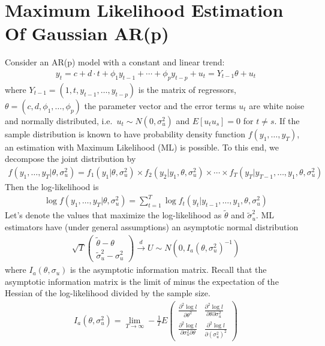 \section[Maximum Likelihood Estimation Of Gaussian AR(p)]{Maximum Likelihood Estimation Of Gaussian AR(p)\label{ex:MaximumLikelihoodEstimationGaussianARp}}
Consider an AR(p) model with a constant and linear trend:
\begin{align*}
y_t = c + d\cdot t + \phi_1 y_{t-1} + \cdots + \phi_p y_{t-p} +u_{t}=Y_{t-1}\theta + u_t
\end{align*}
  where \(Y_{t-1}=(1,t, y_{t-1},\ldots,y_{t-p})\) is the matrix of regressors,
  \(\theta = (c,d,\phi_1,\ldots,\phi_p)\) the parameter vector
  and the error terms \(u_t\) are white noise and normally distributed,
  i.e.\ \( u_t\sim N(0,\sigma_u^2) \) and \(E[u_t u_s]=0\) for \(t\neq s\).
If the sample distribution is known to have probability density function \(f(y_1,\ldots,y_T)\),
  an estimation with Maximum Likelihood (ML) is possible.
To this end, we decompose the joint distribution by
\begin{align*}
f(y_1,\ldots,y_T|\theta,\sigma_u^2)= f_1(y_1|\theta,\sigma_u^2) \times f_2(y_2|y_1,\theta,\sigma_u^2)\times \cdots \times f_T(y_T|y_{T-1},\ldots,y_1,\theta,\sigma_u^2)
\end{align*}
Then the log-likelihood is
\begin{align*}
\log f(y_1,\ldots,y_T|\theta,\sigma_u^2)=\sum_{t=1}^T \log f_t(y_t|y_{t-1},\ldots,y_1,\theta,\sigma_u^2)
\end{align*}
Let's denote the values that maximize the log-likelihood as \(\tilde{\theta}\) and \(\tilde{\sigma}_u^2\).
ML estimators have (under general assumptions) an asymptotic normal distribution
\begin{align*}
\sqrt{T}\begin{pmatrix}\tilde{\theta}-\theta \\ \tilde{\sigma}^2_u - \sigma_u^2 \end{pmatrix} \overset{d}{\rightarrow} U \sim N(0,I_a{(\theta,\sigma_u^2)}^{-1})
\end{align*}
where \(I_a(\theta,\sigma_u)\) is the asymptotic information matrix.
Recall that the asymptotic information matrix is the limit of minus the expectation of the Hessian of the log-likelihood divided by the sample size.
\begin{align*}
I_a(\theta,\sigma_u^2) = \lim\limits_{T\rightarrow \infty}-\frac{1}{T} E
\begin{pmatrix}
\frac{\partial^2 \log l}{\partial \theta^2} & \frac{\partial^2 \log l}{\partial \theta  \partial \sigma_u^2}  \\
\frac{\partial^2 \log l}{\partial \sigma_u^2  \partial \theta} & \frac{\partial^2 \log l}{\partial {(\sigma_u^2)}^2}  
\end{pmatrix}
\end{align*}

